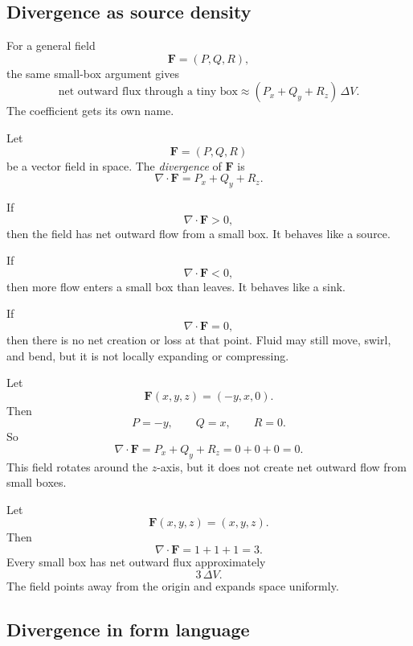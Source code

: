 \subsection{Divergence as source density}

For a general field
\[
    \mathbf F=(P,Q,R),
\]
the same small-box argument gives
\[
\boxed{
    \text{net outward flux through a tiny box}
    \approx
    (P_x+Q_y+R_z)\,\Delta V.
}
\]
The coefficient gets its own name.

\begin{definition}[Divergence]
Let
\[
    \mathbf F=(P,Q,R)
\]
be a vector field in space.  The \emph{divergence} of \(\mathbf F\) is
\[
\boxed{
    \nabla\cdot\mathbf F
    =
    P_x+Q_y+R_z.
}
\]
\end{definition}

If
\[
    \nabla\cdot\mathbf F>0,
\]
then the field has net outward flow from a small box.  It behaves like a source.

If
\[
    \nabla\cdot\mathbf F<0,
\]
then more flow enters a small box than leaves.  It behaves like a sink.

If
\[
    \nabla\cdot\mathbf F=0,
\]
then there is no net creation or loss at that point.  Fluid may still move, swirl, and
bend, but it is not locally expanding or compressing.

\begin{example}
Let
\[
    \mathbf F(x,y,z)=(-y,x,0).
\]
Then
\[
    P=-y,\qquad Q=x,\qquad R=0.
\]
So
\[
    \nabla\cdot\mathbf F
    =
    P_x+Q_y+R_z
    =
    0+0+0
    =
    0.
\]
This field rotates around the \(z\)-axis, but it does not create net outward flow from
small boxes.
\end{example}

\begin{example}
Let
\[
    \mathbf F(x,y,z)=(x,y,z).
\]
Then
\[
    \nabla\cdot\mathbf F=1+1+1=3.
\]
Every small box has net outward flux approximately
\[
    3\,\Delta V.
\]
The field points away from the origin and expands space uniformly.
\end{example}

\subsection{Divergence in form language}

